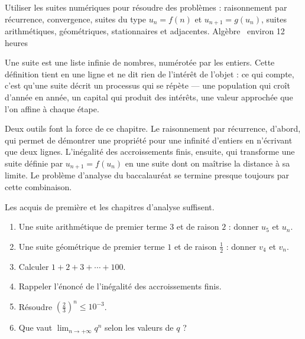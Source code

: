   {Utiliser les suites numériques pour résoudre des problèmes : raisonnement
   par récurrence, convergence, suites du type $u_{n}=f(n)$ et
   $u_{n+1}=g(u_{n})$, suites arithmétiques, géométriques, stationnaires et
   adjacentes.}
  {Algèbre \textbullet\ environ 12 heures}

Une suite est une liste infinie de nombres, numérotée par les entiers. Cette
définition tient en une ligne et ne dit rien de l'intérêt de l'objet : ce qui
compte, c'est qu'une suite décrit un processus qui se répète — une population
qui croît d'année en année, un capital qui produit des intérêts, une valeur
approchée que l'on affine à chaque étape.

Deux outils font la force de ce chapitre. Le raisonnement par récurrence,
d'abord, qui permet de démontrer une propriété pour une infinité d'entiers en
n'écrivant que deux lignes. L'inégalité des accroissements finis, ensuite, qui
transforme une suite définie par $u_{n+1} = f(u_{n})$ en une suite dont on
maîtrise la distance à sa limite. Le problème d'analyse du baccalauréat se
termine presque toujours par cette combinaison.

\begin{revision}
Les acquis de première et les chapitres d'analyse suffisent.

\begin{enumerate}[label=\textbf{\arabic*.}, leftmargin=*, itemsep=0.35em]
  \item Une suite arithmétique de premier terme $3$ et de raison $2$ :
        donner $u_{5}$ et $u_{n}$.
  \item Une suite géométrique de premier terme $1$ et de raison $\frac12$ :
        donner $v_{4}$ et $v_{n}$.
  \item Calculer $1+2+3+\cdots+100$.
  \item Rappeler l'énoncé de l'inégalité des accroissements finis.
  \item Résoudre $\left(\frac23\right)^{n} \leq 10^{-3}$.
  \item Que vaut $\lim_{n\to+\infty}q^{n}$ selon les valeurs de $q$ ?
\end{enumerate}
\end{revision}

